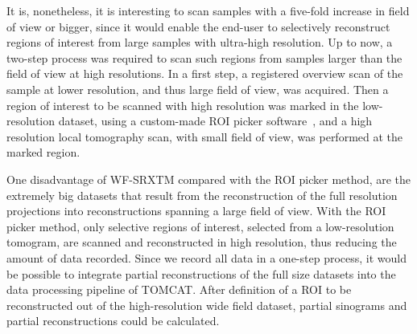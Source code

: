 It is, nonetheless, it is interesting to scan samples with a five-fold increase in field of view or bigger, since it would enable the end-user to selectively reconstruct regions of interest from large samples with ultra-high resolution. Up to now, a two-step process was required to scan such regions from samples larger than the field of view at high resolutions. In a first step, a registered overview scan of the sample at lower resolution, and thus large field of view, was acquired. Then a region of interest to be scanned with high resolution was marked in the low-resolution dataset, using a custom-made ROI picker software~\cite{Heinzer2008}, and a high resolution local tomography scan, with small field of view, was performed at the marked region.

One disadvantage of WF-SRXTM compared with the ROI picker method, are the extremely big datasets that result from the reconstruction of the full resolution projections into reconstructions spanning a large field of view. With the ROI picker method, only selective regions of interest, selected from a low-resolution tomogram, are scanned and reconstructed in high resolution, thus reducing the amount of data recorded. Since we record all data in a one-step process, it would be possible to integrate partial reconstructions of the full size datasets into the data processing pipeline of TOMCAT. After definition of a ROI to be reconstructed out of the high-resolution wide field dataset, partial sinograms and partial reconstructions could be calculated.
